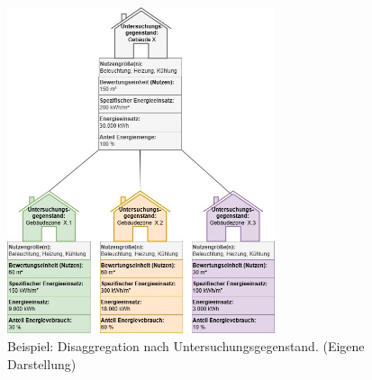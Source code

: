 \begin{figure}[H]
    \centering
    \includegraphics[width=0.7\textwidth]{../../Ressourcen/Abbildungen/Untersuchungsgegenstand_Zerlegt_Beispiel.jpg}
    \caption{Beispiel: Disaggregation nach Untersuchungsgegenstand. (Eigene Darstellung)}
    \label{fig:Disagggregation_Bilanzraum_Untersuchungsgegenstand_Beispiel}
\end{figure}
